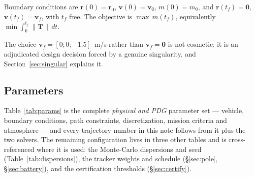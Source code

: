\documentclass[11pt]{article}
\newcommand{\rvec}{\mathbf{r}}
\newcommand{\vvec}{\mathbf{v}}
\newcommand{\Tvec}{\mathbf{T}}
\begin{document}
Boundary conditions are
$\rvec(0) = \rvec_0$, $\vvec(0) = \vvec_0$, $m(0) = m_0$, and
$\rvec(t_f) = \mathbf{0}$, $\vvec(t_f) = \vvec_f$, with $t_f$ free. The
objective is $\max\, m(t_f)$, equivalently
$\min \int_0^{t_f} \lVert \Tvec \rVert \, dt$.

The choice $\vvec_f = [0;0;-1.5]$~m/s rather than $\vvec_f = \mathbf{0}$ is
not cosmetic; it is an adjudicated design decision forced by a genuine
singularity, and Section~\ref{sec:singular} explains it.

\subsection{Parameters}

Table~\ref{tab:params} is the complete \emph{physical and PDG} parameter
set --- vehicle, boundary conditions, path constraints, discretization,
mission criteria and atmosphere --- and every trajectory number in this note
follows from it plus the two solvers. The remaining configuration lives in
three other tables and is cross-referenced where it is used: the
Monte-Carlo dispersions and seed (Table~\ref{tab:dispersions}), the tracker
weights and schedule (\S\ref{sec:pole}, \S\ref{sec:battery}), and the
certification thresholds (\S\ref{sec:certify}).
\end{document}
